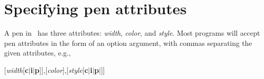 \section{Specifying pen attributes}

%
%
\label{sec:pen}
A pen in \GMT\ has three attributes: \emph{width}, \emph{color},
and \emph{style}.  Most programs will accept pen attributes in
the form of an option argument, with commas separating the
given attributes, e.g.,

\vspace{\baselineskip} 

\par {}[\emph{width}[\textbf{c$|$i$|$p}]],[\emph{color}],[\emph{style}[\textbf{c$|$i$|$p$|$}]]\par 

